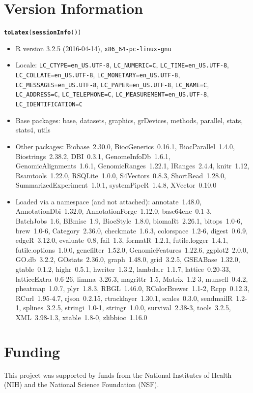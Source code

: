 \documentclass{article}\usepackage[]{graphicx}\usepackage[]{color}
\makeatletter
\newcommand{\hlstd}[1]{\textcolor[rgb]{0.345,0.345,0.345}{#1}}%
\newcommand{\hlkwd}[1]{\textcolor[rgb]{0.737,0.353,0.396}{\textbf{#1}}}%
\newenvironment{kframe}{%
 \def\at@end@of@kframe{}%
 \ifinner\ifhmode%
  \def\at@end@of@kframe{\end{minipage}}%
  \begin{minipage}{\columnwidth}%
 \fi\fi%
 \def\FrameCommand##1{\hskip\@totalleftmargin \hskip-\fboxsep
 \colorbox{shadecolor}{##1}\hskip-\fboxsep
     \hskip-\linewidth \hskip-\@totalleftmargin \hskip\columnwidth}%
 \MakeFramed {\advance\hsize-\width
   \@totalleftmargin\z@ \linewidth\hsize
   \@setminipage}}%
 {\par\unskip\endMakeFramed%
 \at@end@of@kframe}
\makeatother
\begin{document}
\section{Version Information}
\begin{kframe}
\begin{alltt}
\hlkwd{toLatex}\hlstd{(}\hlkwd{sessionInfo}\hlstd{())}
\end{alltt}
\end{kframe}\begin{itemize}\raggedright
  \item R version 3.2.5 (2016-04-14), \verb|x86_64-pc-linux-gnu|
  \item Locale: \verb|LC_CTYPE=en_US.UTF-8|, \verb|LC_NUMERIC=C|, \verb|LC_TIME=en_US.UTF-8|, \verb|LC_COLLATE=en_US.UTF-8|, \verb|LC_MONETARY=en_US.UTF-8|, \verb|LC_MESSAGES=en_US.UTF-8|, \verb|LC_PAPER=en_US.UTF-8|, \verb|LC_NAME=C|, \verb|LC_ADDRESS=C|, \verb|LC_TELEPHONE=C|, \verb|LC_MEASUREMENT=en_US.UTF-8|, \verb|LC_IDENTIFICATION=C|
  \item Base packages: base, datasets, graphics, grDevices, methods, parallel,
    stats, stats4, utils
  \item Other packages: Biobase~2.30.0, BiocGenerics~0.16.1, BiocParallel~1.4.0,
    Biostrings~2.38.2, DBI~0.3.1, GenomeInfoDb~1.6.1, GenomicAlignments~1.6.1,
    GenomicRanges~1.22.1, IRanges~2.4.4, knitr~1.12, Rsamtools~1.22.0,
    RSQLite~1.0.0, S4Vectors~0.8.3, ShortRead~1.28.0, SummarizedExperiment~1.0.1,
    systemPipeR~1.4.8, XVector~0.10.0
  \item Loaded via a namespace (and not attached): annotate~1.48.0,
    AnnotationDbi~1.32.0, AnnotationForge~1.12.0, base64enc~0.1-3, BatchJobs~1.6,
    BBmisc~1.9, BiocStyle~1.8.0, biomaRt~2.26.1, bitops~1.0-6, brew~1.0-6,
    Category~2.36.0, checkmate~1.6.3, colorspace~1.2-6, digest~0.6.9, edgeR~3.12.0,
    evaluate~0.8, fail~1.3, formatR~1.2.1, futile.logger~1.4.1,
    futile.options~1.0.0, genefilter~1.52.0, GenomicFeatures~1.22.6, ggplot2~2.0.0,
    GO.db~3.2.2, GOstats~2.36.0, graph~1.48.0, grid~3.2.5, GSEABase~1.32.0,
    gtable~0.1.2, highr~0.5.1, hwriter~1.3.2, lambda.r~1.1.7, lattice~0.20-33,
    latticeExtra~0.6-26, limma~3.26.3, magrittr~1.5, Matrix~1.2-3, munsell~0.4.2,
    pheatmap~1.0.7, plyr~1.8.3, RBGL~1.46.0, RColorBrewer~1.1-2, Rcpp~0.12.3,
    RCurl~1.95-4.7, rjson~0.2.15, rtracklayer~1.30.1, scales~0.3.0, sendmailR~1.2-1,
    splines~3.2.5, stringi~1.0-1, stringr~1.0.0, survival~2.38-3, tools~3.2.5,
    XML~3.98-1.3, xtable~1.8-0, zlibbioc~1.16.0
\end{itemize}


\section{Funding}
This project was supported by funds from the National Institutes of Health (NIH) and the National Science Foundation (NSF).


\end{document}
